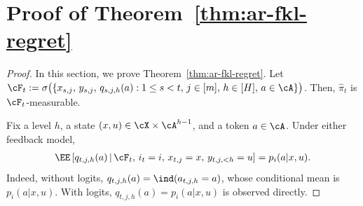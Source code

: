 \documentclass[11pt]{article}
\begin{document}
\section{Proof of Theorem~\ref{thm:ar-fkl-regret}}
\label{sec:proof-fkl-thm}
\begin{proof}
In this section, we prove Theorem~\ref{thm:ar-fkl-regret}.
Let $\cF_t:=\sigma\big(
        \{
            x_{s,j},\,y_{s,j},\,q_{s,j,h}(a)
            :
            1\leq s<t,\,
            j\in[m],\,
            h\in[H],\,
            a\in\cA
        \}
    \big)$. Then, $\hat\pi_t$ is $\cF_t$-measurable. 
    
Fix a level $h$, a state $(x,u)\in\cX\times\cA^{h-1}$, and a token
$a\in\cA$. Under either feedback model,
\begin{align}
    \EE\left[
        q_{t,j,h}(a)
        \,\middle|\,
        \cF_t,\,
        i_t=i,\,
        x_{t,j}=x,\,
        y_{t,j,<h}=u
    \right]
    =
    p_i(a|x,u).
    \label{eq:proof-feedback-conditional-mean}
\end{align}
Indeed, without logits, $q_{t,j,h}(a)=\ind(a_{t,j,h}=a)$, whose
conditional mean is $p_i(a|x,u)$. With logits,
$q_{t,j,h}(a)=p_i(a|x,u)$ is observed directly.


\end{proof}
\end{document}
